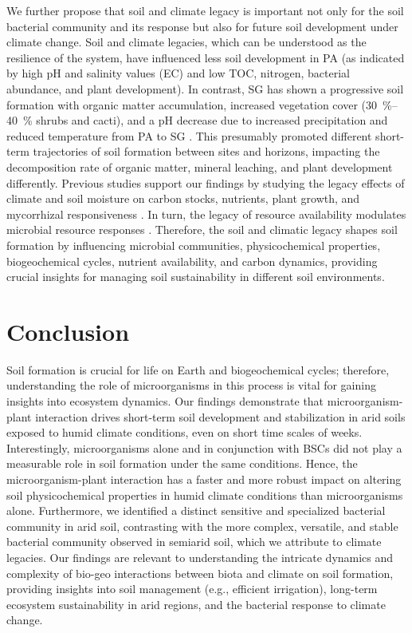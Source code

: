 We further propose that soil and climate legacy is important not only for the soil bacterial community and its response but also for future soil development under climate change. Soil and climate legacies, which can be understood as the resilience of the system, have influenced less soil development in PA (as indicated by high pH and salinity values (EC) and low TOC, nitrogen, bacterial abundance, and plant development). In contrast, SG has shown a progressive soil formation with organic matter accumulation, increased vegetation cover (\SIrange{30}{40}{\percent} shrubs and cacti), and a pH decrease due to increased precipitation and reduced temperature from PA to SG \citep{Bernhard2018}. This presumably promoted different short-term trajectories of soil formation between sites and horizons, impacting the decomposition rate of organic matter, mineral leaching, and plant development differently. Previous studies support our findings by studying the legacy effects of climate and soil moisture on carbon stocks, nutrients, plant growth, and mycorrhizal responsiveness \citep{Cavagnaro2016, DelgadoBaquerizo2017b}. In turn, the legacy of resource availability modulates microbial resource responses \citep{Yuan2022}. Therefore, the soil and climatic legacy shapes soil formation by influencing microbial communities, physicochemical properties, biogeochemical cycles, nutrient availability, and carbon dynamics, providing crucial insights for managing soil sustainability in different soil environments.

\section{Conclusion}

Soil formation is crucial for life on Earth and biogeochemical cycles; therefore, understanding the role of microorganisms in this process is vital for gaining insights into ecosystem dynamics. Our findings demonstrate that microorganism-plant interaction drives short-term soil development and stabilization in arid soils exposed to humid climate conditions, even on short time scales of weeks. Interestingly, microorganisms alone and in conjunction with BSCs did not play a measurable role in soil formation under the same conditions. Hence, the microorganism-plant interaction has a faster and more robust impact on altering soil physicochemical properties in humid climate conditions than microorganisms alone. Furthermore, we identified a distinct sensitive and specialized bacterial community in arid soil, contrasting with the more complex, versatile, and stable bacterial community observed in semiarid soil, which we attribute to climate legacies. Our findings are relevant to understanding the intricate dynamics and complexity of bio-geo interactions between biota and climate on soil formation, providing insights into soil management (e.g., efficient irrigation), long-term ecosystem sustainability in arid regions, and the bacterial response to climate change.

